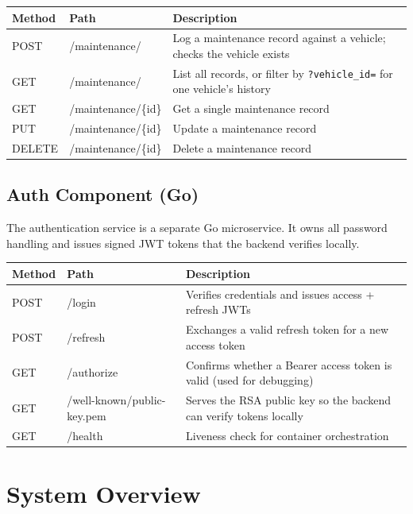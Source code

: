 \documentclass[11pt,a4paper]{article}
\begin{document}
\begin{table}[H]
\centering
\begin{tabularx}{\textwidth}{|p{2cm}|p{4cm}|X|}
\hline
\textbf{Method} & \textbf{Path} & \textbf{Description} \\
\hline
POST & /maintenance/ & Log a maintenance record against a vehicle; checks the vehicle exists \\
\hline
GET & /maintenance/ & List all records, or filter by \texttt{?vehicle\_id=} for one vehicle's history \\
\hline
GET & /maintenance/\{id\} & Get a single maintenance record \\
\hline
PUT & /maintenance/\{id\} & Update a maintenance record \\
\hline
DELETE & /maintenance/\{id\} & Delete a maintenance record \\
\hline
\end{tabularx}
\end{table}

\subsection{Auth Component (Go)}

The authentication service is a separate Go microservice. It owns all password handling and issues signed JWT tokens that the backend verifies locally.

\begin{table}[H]
\centering
\begin{tabularx}{\textwidth}{|p{2cm}|p{4cm}|X|}
\hline
\textbf{Method} & \textbf{Path} & \textbf{Description} \\
\hline
POST & /login & Verifies credentials and issues access + refresh JWTs \\
\hline
POST & /refresh & Exchanges a valid refresh token for a new access token \\
\hline
GET & /authorize & Confirms whether a Bearer access token is valid (used for debugging) \\
\hline
GET & /well-known/public-key.pem & Serves the RSA public key so the backend can verify tokens locally \\
\hline
GET & /health & Liveness check for container orchestration \\
\hline
\end{tabularx}
\end{table}

\section{System Overview}
\end{document}
